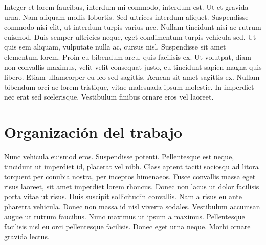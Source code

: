 Integer et lorem faucibus, interdum mi commodo, interdum est. Ut et gravida urna. Nam aliquam mollis lobortis. Sed ultrices interdum aliquet. Suspendisse commodo nisi elit, ut interdum turpis varius nec. Nullam tincidunt nisi ac rutrum euismod. Duis semper ultricies neque, eget condimentum turpis vehicula sed. Ut quis sem aliquam, vulputate nulla ac, cursus nisl. Suspendisse sit amet elementum lorem. Proin eu bibendum arcu, quis facilisis ex. Ut volutpat, diam non convallis maximus, velit velit consequat justo, eu tincidunt sapien magna quis libero. Etiam ullamcorper eu leo sed sagittis. Aenean sit amet sagittis ex. Nullam bibendum orci ac lorem tristique, vitae malesuada ipsum molestie. In imperdiet nec erat sed scelerisque. Vestibulum finibus ornare eros vel laoreet.

\section{Organización del trabajo}

Nunc vehicula euismod eros. Suspendisse potenti. Pellentesque est neque, tincidunt ut imperdiet id, placerat vel nibh. Class aptent taciti sociosqu ad litora torquent per conubia nostra, per inceptos himenaeos. Fusce convallis massa eget risus laoreet, sit amet imperdiet lorem rhoncus. Donec non lacus ut dolor facilisis porta vitae ut risus. Duis suscipit sollicitudin convallis. Nam a risus eu ante pharetra vehicula. Donec non massa id nisl viverra sodales. Vestibulum accumsan augue ut rutrum faucibus. Nunc maximus ut ipsum a maximus. Pellentesque facilisis nisl eu orci pellentesque facilisis. Donec eget urna neque. Morbi ornare gravida lectus.

